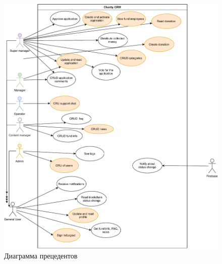 \documentclass[a4paper,12pt,reqno]{article}
\begin{document}
	\newpage
	\begin{figure}[H]
		\centering
		\includegraphics[width = 0.9\linewidth]{img/key-usecase.pdf}
		\caption{Диаграмма прецедентов}
    \end{figure}
    
    \newpage
	
\end{document}
